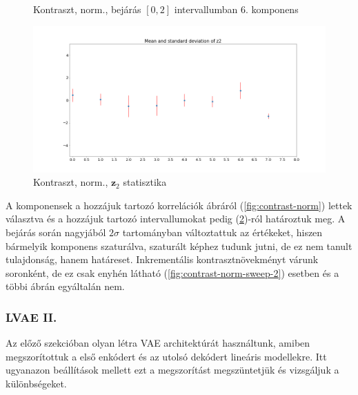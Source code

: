 \documentclass[12pt, english]{article}
\begin{document}
\begin{figure}[H]
\begin{minipage}{0.5\linewidth}
    \caption{Kontraszt, norm., bejárás $[0, 2]$ \newline intervallumban $6.$ komponens} 
    \label{fig:contrast-norm-sweep-6}
  \end{minipage}
\end{figure}

\begin{figure}[H]
    \centering
    \includegraphics[width=.85\linewidth]{sweep/norm_contrast_z2_stats.png} 
    \caption{Kontraszt, norm., $\bm{z}_2$ statisztika} 
    \label{fig:contrast-norm-stats}
\end{figure}

\vspace{4mm}

\par A komponensek a hozzájuk tartozó korrelációk ábráról (\ref{fig:contrast-norm}) lettek választva és a hozzájuk tartozó intervallumokat pedig (\ref{fig:contrast-norm-stats})-ról határoztuk meg. A bejárás során nagyjából $2\sigma$ tartományban változtattuk az értékeket, hiszen bármelyik komponens szaturálva, szaturált képhez tudunk jutni, de ez nem tanult tulajdonság, hanem határeset. Inkrementális kontrasztnövekményt várunk soronként, de ez csak enyhén látható (\ref{fig:contrast-norm-sweep-2}) esetben és a többi ábrán egyáltalán nem.

\vspace{4mm}

\subsubsection{LVAE II.}

\vspace{4mm}

\par Az előző szekcióban olyan létra VAE architektúrát használtunk, amiben megszorítottuk a első enkódert és az utolsó dekódert lineáris modellekre. Itt ugyanazon beállítások mellett ezt a megszorítást megszüntetjük és vizsgáljuk a különbségeket.
\end{document}
